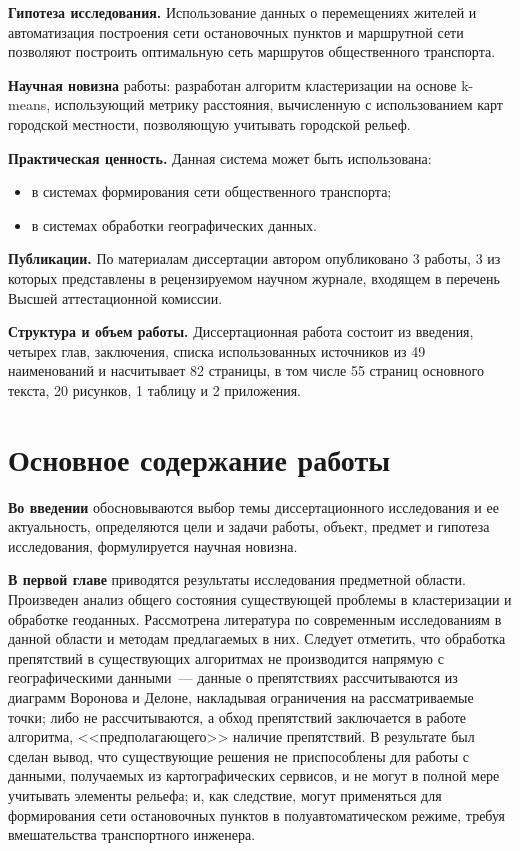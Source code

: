\textbf{Гипотеза исследования.} Использование данных о перемещениях жителей и автоматизация построения сети остановочных пунктов и маршрутной сети позволяют построить оптимальную сеть маршрутов общественного транспорта.

\textbf{Научная новизна} работы: разработан алгоритм кластеризации на основе
k-means, использующий метрику расстояния, вычисленную с использованием
карт городской местности, позволяющую учитывать городской рельеф.

\textbf{Практическая ценность.} Данная система может быть использована:
\begin{itemize}
    \item в системах формирования сети общественного транспорта;
    \item в системах обработки географических данных.
\end{itemize}

\textbf{Публикации.} По материалам диссертации автором опубликовано 3 работы, 3 из которых представлены в рецензируемом научном журнале, входящем в перечень Высшей аттестационной комиссии. 

\textbf{Структура и объем работы.} Диссертационная работа состоит из введения, четырех глав, заключения, списка использованных источников из 49 наименований и насчитывает 82 страницы, в том числе 55 страниц основного текста, 20 рисунков, 1 таблицу и 2 приложения.

\section{Основное содержание работы}
\textbf{Во введении} обосновываются выбор темы диссертационного исследования и ее актуальность, определяются 
цели и задачи работы, объект, предмет и гипотеза исследования, формулируется научная новизна.

\textbf{В первой главе} приводятся результаты исследования предметной области. Произведен анализ общего состояния существующей проблемы в кластеризации и обработке геоданных. Рассмотрена литература по современным исследованиям в данной области и методам предлагаемых в них. Следует отметить, что обработка препятствий в существующих алгоритмах не производится напрямую с географическими данными~--- данные о препятствиях рассчитываются из диаграмм Воронова и Делоне, накладывая ограничения на рассматриваемые точки; либо не рассчитываются, а обход препятствий заключается в работе алгоритма, <<предполагающего>> наличие препятствий. В результате был сделан вывод, что существующие решения не приспособлены для работы с данными, получаемых из картографических сервисов, и не могут в полной мере учитывать элементы рельефа; и, как следствие, могут применяться для формирования сети остановочных пунктов в полуавтоматическом режиме, требуя вмешательства транспортного инженера.

